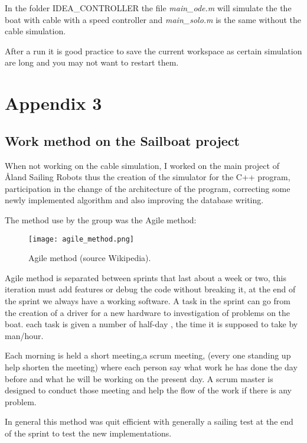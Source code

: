 \documentclass[twoside,12pt]{report} %
\begin{document}
In the folder IDEA\_CONTROLLER the file \textit{main\_ode.m}  will simulate the the boat with cable with a speed controller and \textit{main\_solo.m} is the same without the cable simulation.

After a run it is good practice to save the current workspace as certain simulation are long and you may not want to restart them.



\chapter*{Appendix 3}

\section*{Work method on the Sailboat project}

When not working on the cable simulation, I worked on the main project of 
\r{A}land Sailing Robots thus the creation of the simulator for the C++ program, participation in the change of the architecture of the program, correcting some newly implemented  algorithm and also improving the database writing.

The method use by the group was the Agile method:
\begin{figure}[H]
\centering
    \texttt{[image: agile\_method.png]}
    \caption*{Agile method (source Wikipedia).}
\end{figure}

Agile method is separated  between sprints that last about a week or two, this iteration must add features or debug the code without breaking it, at the end of the sprint we always have a working software. A task in the sprint can go from the creation of a driver for a new hardware to investigation of problems on the boat. each task is given a number of half-day , the time it is supposed to take by man/hour.

Each morning is held a short meeting,a scrum meeting, (every one standing up help shorten the meeting) where each person say what work he has done the day before and what he will be working on the present day. A scrum master is designed to conduct those meeting and help the flow of the work if there is any problem.

In general this method was quit efficient with generally a sailing test at the end of the sprint to test the new implementations.
\end{document}
